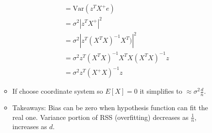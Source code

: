 \documentclass[10pt]{article}
\begin{document}
\begin{description}
\begin{itemize}
\begin{itemize}
\begin{align*}
							&= \text{Var}(z^{T}X^{+}e)\\
							&= \sigma^{2} |z^{T}X^{+}|^{2}\\
							&= \sigma^{2} |z^{T}(X^{T}X)^{-1}X^{T})|^{2}\\
							&= \sigma^{2} z^{T}(X^{T}X)^{-1}X^{T}X(X^{T}X)^{-1}z\\
							&= \sigma^{2}z^{T}(X^{+}X)^{-1}z
						\end{align*}
					\item If choose coordinate system so $E[X] = 0$ it simplifies to $\approx \sigma^{2}\frac{d}{n}$.
					\item Takeaways: Bias can be zero when hypothesis function can fit the real one. Variance portion of RSS (overfitting) decreases as $\frac{1}{n}$, increases as $d$.
				\end{itemize}
	\end{itemize}
\end{description}

\newpage
\end{document}
